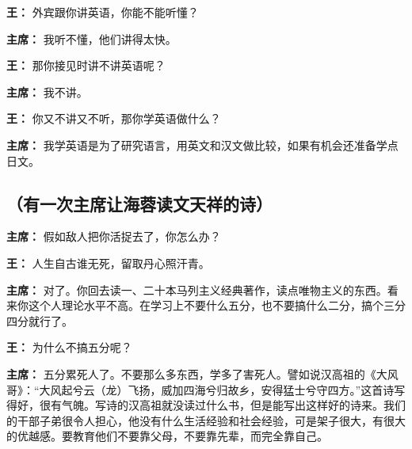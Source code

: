\begin{list}{}{
    \setlength{\topsep}{0pt}        %
    \setlength{\partopsep}{0pt}     %
    \setlength{\parsep}{\parskip}   %
    \setlength{\itemsep}{\lineskip}       %
    \setlength{\labelsep}{0pt}%
    \setlength{\labelwidth}{3em}%
    \setlength{\itemindent}{0pt}%
    \setlength\listparindent{\parindent}
    \setlength{\leftmargin}{3em}
    \setlength{\rightmargin}{0pt}
    }

\item[\textbf{王：}] 外宾跟你讲英语，你能不能听懂？

\item[\textbf{主席：}] 我听不懂，他们讲得太快。

\item[\textbf{王：}] 那你接见时讲不讲英语呢？

\item[\textbf{主席：}] 我不讲。

\item[\textbf{王：}] 你又不讲又不听，那你学英语做什么？

\item[\textbf{主席：}] 我学英语是为了研究语言，用英文和汉文做比较，如果有机会还准备学点日文。
\end{list}

\subsection{（有一次主席让海蓉读文天祥的诗）}
\begin{list}{}{
    \setlength{\topsep}{0pt}        %
    \setlength{\partopsep}{0pt}     %
    \setlength{\parsep}{\parskip}   %
    \setlength{\itemsep}{\lineskip}       %
    \setlength{\labelsep}{0pt}%
    \setlength{\labelwidth}{3em}%
    \setlength{\itemindent}{0pt}%
    \setlength\listparindent{\parindent}
    \setlength{\leftmargin}{3em}
    \setlength{\rightmargin}{0pt}
    }
\item[\textbf{主席：}] 假如敌人把你活捉去了，你怎么办？

\item[\textbf{王：}] 人生自古谁无死，留取丹心照汗青。

\item[\textbf{主席：}] 对了。你回去读一、二十本马列主义经典著作，读点唯物主义的东西。看来你这个人理论水平不高。在学习上不要什么五分，也不要搞什么二分，搞个三分四分就行了。

\item[\textbf{王：}] 为什么不搞五分呢？

\item[\textbf{主席：}] 五分累死人了。不要那么多东西，学多了害死人。譬如说汉高祖的《大风哥》：“大风起兮云（龙）飞扬，威加四海兮归故乡，安得猛士兮守四方。”这首诗写得好，很有气魄。写诗的汉高祖就没读过什么书，但是能写出这样好的诗来。我们的干部子弟很令人担心，他没有什么生活经验和社会经验，可是架子很大，有很大的优越感。要教育他们不要靠父母，不要靠先辈，而完全靠自己。
\end{list}

